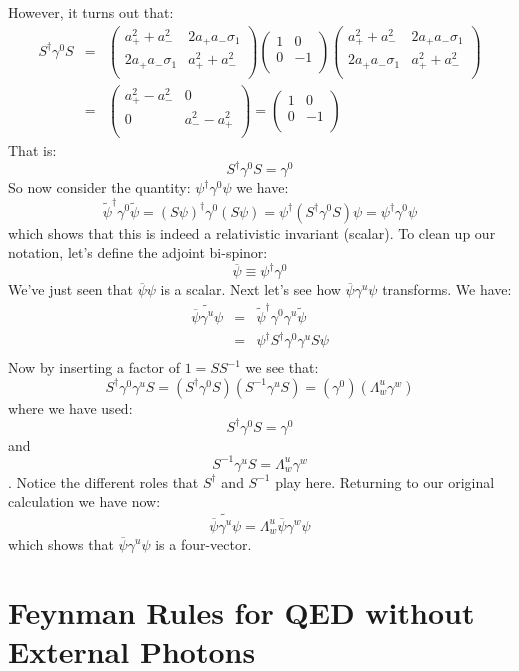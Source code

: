 \documentclass[12pt]{book}
\begin{document}
However, it turns out that:
\begin{eqnarray*}
S^\dagger \gamma^0 S &=& 
\begin{pmatrix}
a_+^2+a_-^2        & 2 a_+ a_- \sigma_1 \\
2 a_+ a_- \sigma_1 & a_+^2+a_-^2 \\
\end{pmatrix}
\begin{pmatrix}
1        & 0 \\
0        & -1 \\
\end{pmatrix}
\begin{pmatrix}
a_+^2+a_-^2        & 2 a_+ a_- \sigma_1 \\
2 a_+ a_- \sigma_1 & a_+^2+a_-^2 \\
\end{pmatrix}\\[3pt]
&=& \begin{pmatrix}
a_+^2-a_-^2        & 0 \\
0                  & a_-^2-a_+^2 \\
\end{pmatrix}
= \begin{pmatrix}
1        & 0 \\
0        & -1 \\
\end{pmatrix}
\end{eqnarray*}
That is:
$$S^\dagger \gamma^0 S = \gamma^0$$
So now consider the quantity:
$\psi^\dagger \gamma^0 \psi$
we have:
$$\widetilde{\psi}^\dagger \gamma^0 \widetilde{\psi}
= (S \psi)^\dagger \gamma^0 (S \psi) 
= \psi^\dagger (S^\dagger \gamma^0 S) \psi
= \psi^\dagger \gamma^0 \psi
$$
which shows that this is indeed a relativistic invariant (scalar).  To clean up our notation, let's define the adjoint bi-spinor:
$$\overline{\psi} \equiv \psi^\dagger \gamma^0 $$
We've just seen that $\overline{\psi} \psi$ is a scalar.  Next let's see how $\overline{\psi} \gamma^u \psi$ transforms.  We have:
\begin{eqnarray*}
\widetilde{\overline{\psi} \gamma^u \psi} &=& 
\widetilde{\psi}^\dagger \gamma^0 \gamma^u \widetilde{\psi} \\
&=& \psi^\dagger S^\dagger \gamma^0 \gamma^u S \psi \\
\end{eqnarray*}
Now by inserting a factor of $1 = S S^{-1}$ we see that:
$$S^\dagger \gamma^0 \gamma^u S = (S^\dagger \gamma^0 S) (S^{-1}\gamma^u S)
= (\gamma^0) (\Lambda^u_w \gamma^w)$$
where we have used:
$$S^\dagger \gamma^0 S = \gamma^0$$
and
$$S^{-1} \gamma^u S = \Lambda^u_w \gamma^w$$.
Notice the different roles that $S^\dagger$ and $S^{-1}$ play here.  Returning to our original calculation we have now:
$$\widetilde{\overline{\psi} \gamma^u \psi} = \Lambda^u_w \overline{\psi} \gamma^w \psi$$
which shows that $\overline{\psi} \gamma^u \psi$ is a four-vector.












\section{Feynman Rules for QED without External Photons}
\end{document}
